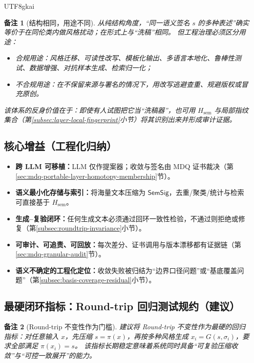 \documentclass[12pt]{article}
\newtheorem{remark}{备注}[section]
\begin{document}
\begin{CJK*}{UTF8}{gkai}
\begin{remark}[结构相同，用途不同]
从纯结构角度，“同一语义签名 $s$ 的多种表述”确实等价于在同伦类内做风格扰动；在形式上与“洗稿”相同。
但工程治理必须区分用途：
\begin{itemize}
  \item 合规用途：风格迁移、可读性改写、模板化输出、多语言本地化、鲁棒性测试、数据增强、对抗样本生成、检索归一化；
  \item 不合规用途：在不保留来源与署名的情况下，用改写逃避查重、规避版权或冒充原创。
\end{itemize}
该体系的反身价值在于：即使有人试图把它当“洗稿器”，也可用 $H_{\mathrm{sem}}$ 与局部指纹集合（第\ref{subsec:layer-local-fingerprint}小节）将其识别出来并形成审计证据。
\end{remark}

\subsection{核心增益（工程化归纳）}
\label{subsec:engineering-gains}

\begin{itemize}
  \item \textbf{跨 LLM 可移植：}LLM 仅作提案器；收敛与签名由 MDQ 证书裁决（第\ref{sec:mdq-portable-layer-homotopy-membership}节）。
  \item \textbf{语义最小化存储与索引：}将海量文本压缩为 $\mathsf{SemSig}$，去重/聚类/统计与检索可直接基于 $H_{\mathrm{sem}}$。
  \item \textbf{生成--复验闭环：}任何生成文本必须通过回环一致性检验，不通过则拒绝或修复（第\ref{subsec:roundtrip-invariance}小节）。
  \item \textbf{可审计、可追责、可回放：}每次差分、证书调用与版本漂移都有证据链（第\ref{sec:mdq-granular-audit}节）。
  \item \textbf{语义不确定的工程化定位：}收敛失败被归结为“边界口径问题”或“基底覆盖问题”（第\ref{subsec:basis-coverage-residual}小节）。
\end{itemize}

\subsection{最硬闭环指标：Round-trip 回归测试规约（建议）}
\label{subsec:roundtrip-regression}

\begin{remark}[Round-trip 不变性作为门槛]
建议将 Round-trip 不变性作为最硬的回归指标：对任意输入 $x$，先压缩 $s=\pi(x)$，再按多种风格生成
$x_i=G(s,\sigma_i)$，要求全部满足 $\pi(x_i)=s$。
该指标长期稳定意味着系统同时具备“可复验压缩收敛”与“可控一致展开”的能力。
\end{remark}


\end{CJK*}
\end{document}
